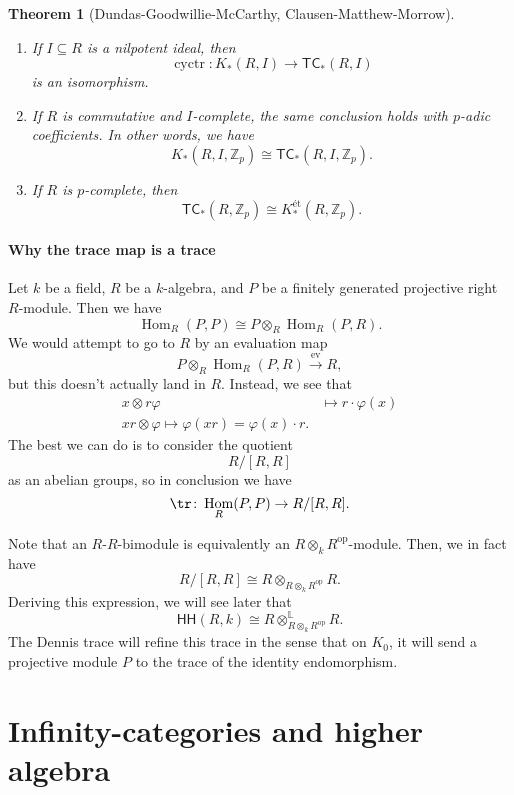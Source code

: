 \documentclass[10pt]{amsart}
\newtheorem{thm}{Theorem}[subsection]
\theoremstyle{definition}
\theoremstyle{remark}
\theoremstyle{plain}
\theoremstyle{definition}
\theoremstyle{remark}
\newcommand{\Z}{\mathbb{Z}}
\renewcommand{\L}{\mathbb{L}}
\newcommand{\on}[1]{\operatorname{#1}}
\newcommand{\ms}[1]{\mathsf{#1}}
\newcommand{\1}{\mathbf{1}}
\newcommand{\2}{\mathbf{2}}
\newcommand{\3}{\mathbf{3}}
\newcommand{\TC}{\ms{TC}}
\newcommand{\HH}{\ms{HH}}
\DeclareMathOperator{\Hom}{Hom}
\DeclareMathOperator{\ev}{ev}
\DeclareMathOperator{\op}{op}
\begin{document}
\begin{thm}[Dundas-Goodwillie-McCarthy, Clausen-Matthew-Morrow]\leavevmode
    \begin{enumerate}
        \item If $I \subseteq R$ is a nilpotent ideal, then 
        \[ \on{cyctr} \colon K_*(R,I) \to \TC_*(R, I) \]
        is an isomorphism.
        \item If $R$ is commutative and $I$-complete, the same conclusion holds with $p$-adic coefficients. In other words, we have
        \[
            K_*(R, I, \Z_p) \cong \TC_*(R, I, \Z_p).
        \]
        \item If $R$ is $p$-complete, then 
        \[ \TC_*(R, \Z_p) \cong K_*^{\text{\'et}}(R, \Z_p). \]
    \end{enumerate}
\end{thm}

\subsection{Why the trace map is a trace}%
\label{sub:Why the trace map is a trace}

Let $k$ be a field, $R$ be a $k$-algebra, and $P$ be a finitely generated projective right $R$-module. Then we have
\[ \Hom_R(P, P) \cong P \otimes_R \Hom_R(P, R). \]
We would attempt to go to $R$ by an evaluation map
\[ P \otimes_R \Hom_R(P, R) \xrightarrow{\ev} R, \]
but this doesn't actually land in $R$. Instead, we see that
\begin{align*}
    x \otimes r \varphi &\mapsto r \cdot \varphi(x) \\
    xr \otimes \varphi \mapsto \varphi(xr) = \varphi(x) \cdot r.
\end{align*}
The best we can do is to consider the quotient
\[ R / [R,R] \]
as an abelian groups, so in conclusion we have
\[ \tr \colon \Hom_R(P, P) \to R/[R,R]. \]

Note that an $R$-$R$-bimodule is equivalently an $R \otimes_k R^{\op}$-module. Then, we in fact have
\[ R/[R,R] \cong R \otimes_{R \otimes_k R^{\op}} R. \]
Deriving this expression, we will see later that
\[ \HH(R, k) \cong R \otimes^{\L}_{R \otimes_k R^{\op}} R. \]
The Dennis trace will refine this trace in the sense that on $K_0$, it will send a projective module $P$ to the trace of the identity endomorphism.

\part{Infinity-categories and higher algebra}
\end{document}
